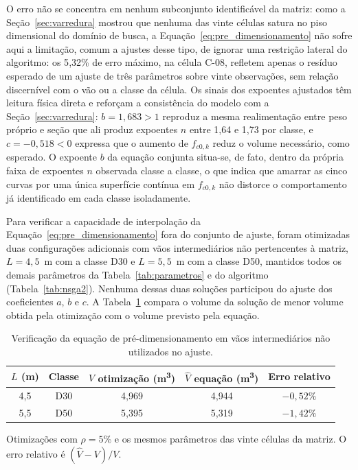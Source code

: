 O erro não se concentra em nenhum subconjunto identificável da matriz: como a Seção~\ref{sec:varredura} mostrou que nenhuma das vinte células satura no piso dimensional do domínio de busca, a Equação~\eqref{eq:pre_dimensionamento} não sofre aqui a limitação, comum a ajustes desse tipo, de ignorar uma restrição lateral do algoritmo: os 5{,}32\% de erro máximo, na célula C-08, refletem apenas o resíduo esperado de um ajuste de três parâmetros sobre vinte observações, sem relação discernível com o vão ou a classe da célula.
Os sinais dos expoentes ajustados têm leitura física direta e reforçam a consistência do modelo com a Seção~\ref{sec:varredura}: $b = 1{,}683 > 1$ reproduz a mesma realimentação entre peso próprio e seção que ali produz expoentes $n$ entre 1{,}64 e 1{,}73 por classe, e $c = -0{,}518 < 0$ expressa que o aumento de $f_{c0,k}$ reduz o volume necessário, como esperado.
O expoente $b$ da equação conjunta situa-se, de fato, dentro da própria faixa de expoentes $n$ observada classe a classe, o que indica que amarrar as cinco curvas por uma única superfície contínua em $f_{c0,k}$ não distorce o comportamento já identificado em cada classe isoladamente.

Para verificar a capacidade de interpolação da Equação~\eqref{eq:pre_dimensionamento} fora do conjunto de ajuste, foram otimizadas duas configurações adicionais com vãos intermediários não pertencentes à matriz, $L = 4{,}5$~m com a classe D30 e $L = 5{,}5$~m com a classe D50, mantidos todos os demais parâmetros da Tabela~\ref{tab:parametros} e do algoritmo (Tabela~\ref{tab:nsga2}).
Nenhuma dessas duas soluções participou do ajuste dos coeficientes $a$, $b$ e $c$.
A Tabela~\ref{tab:validacao_equacao} compara o volume da solução de menor volume obtida pela otimização com o volume previsto pela equação.

\begin{table}[!ht]
\caption{Verificação da equação de pré-dimensionamento em vãos intermediários não utilizados no ajuste.\label{tab:validacao_equacao}}
\begin{threeparttable}
\begin{tabular*}{\columnwidth}{@{\extracolsep\fill}ccccc@{\extracolsep\fill}}
\toprule
$L$ (m) & Classe & $V$ otimização (m\textsuperscript{3}) & $\hat{V}$ equação (m\textsuperscript{3}) & Erro relativo \\
\midrule
4{,}5 & D30 & 4{,}969 & 4{,}944 & $-0{,}52\%$ \\
5{,}5 & D50 & 5{,}395 & 5{,}319 & $-1{,}42\%$ \\
\bottomrule
\end{tabular*}
\begin{tablenotes}
\footnotesize
\item Otimizações com $\rho = 5\%$ e os mesmos parâmetros das vinte células da matriz. O erro relativo é $(\hat{V} - V)/V$.
\end{tablenotes}
\end{threeparttable}
\end{table}


